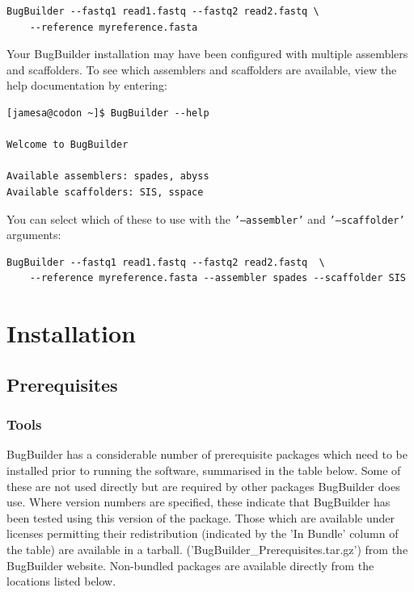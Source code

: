 \documentclass[a4paper,10pt]{article}
\begin{document}
\begin{verbatim}
BugBuilder --fastq1 read1.fastq --fastq2 read2.fastq \
    --reference myreference.fasta
\end{verbatim}

Your BugBuilder installation may have been configured with multiple assemblers and scaffolders. To
see which assemblers and scaffolders are available, view the help documentation by entering:

\begin{verbatim}
[jamesa@codon ~]$ BugBuilder --help

Welcome to BugBuilder

Available assemblers: spades, abyss
Available scaffolders: SIS, sspace
\end{verbatim}

You can select which of these to use with the {\tt '--assembler'} and {\tt '--scaffolder'}
arguments:

\begin{verbatim}
BugBuilder --fastq1 read1.fastq --fastq2 read2.fastq  \
    --reference myreference.fasta --assembler spades --scaffolder SIS
\end{verbatim}

\section{Installation}

\subsection{Prerequisites}

\subsubsection{Tools}

BugBuilder has a considerable number of prerequisite packages which need to be installed prior to
running the software, summarised in the table below. Some of these are not used directly but are
required by other packages BugBuilder does use. Where version numbers are specified, these indicate
that BugBuilder has been tested using this version of the package. Those which are available under
licenses permitting their redistribution (indicated by the 'In Bundle' column of the table) are
available in a tarball.  ('BugBuilder\_Prerequisites.tar.gz') from the BugBuilder website.
Non-bundled packages are available directly from the locations listed below.
\end{document}
